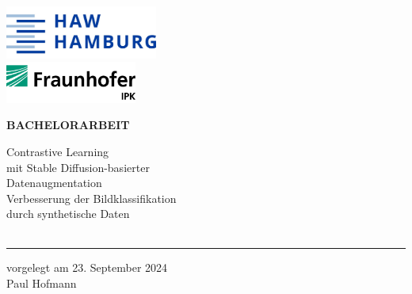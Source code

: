 \begin{titlepage}
  \color{haw} %
  \raggedright %

  \hspace{\fill}\includegraphics[width=5.00cm]{logo_haw.jpg}\\
  \vspace{0.4cm}
  \hspace{\fill}\includegraphics[width=4.30cm]{logo_fraunhofer-ipk.png}\\

  \vspace{5cm}

  \setmainfont{Open Sans} %
  \small\textbf{BACHELORARBEIT}

  \vspace{8mm}

  \begin{minipage}{0.8\linewidth}
    \setmainfont{Martel Heavy} \LARGE
    Contrastive Learning\\[1mm] %
    mit Stable Diffusion-basierter\\[1mm]
    Datenaugmentation\\[4mm]
    \setmainfont{Open Sans} \Large
    Verbesserung der Bildklassifikation\\[1mm]
    durch synthetische Daten\\[1mm]
    \,\rule{11mm}{1.2mm}
  \end{minipage}

  \vspace{9.2mm}

  vorgelegt am 23. September 2024\\
  Paul Hofmann

  \vspace{3cm}


\end{titlepage}
